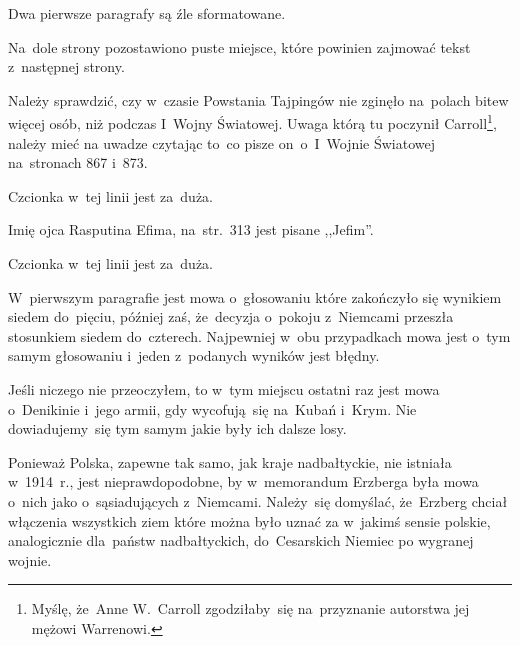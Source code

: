 \documentclass[a4paper,11pt]{article}
\begin{document}
\start {} Dwa pierwsze paragrafy są źle sformatowane.

\vspace{\spaceFour}


\start {} Na~dole strony pozostawiono puste miejsce, które
powinien zajmować tekst z~następnej strony.

\vspace{\spaceFour}


\start {} Należy sprawdzić, czy w~czasie Powstania Tajpingów
nie zginęło na~polach bitew więcej osób, niż podczas I~Wojny
Światowej. Uwaga którą tu poczynił Carroll\footnote{Myślę, że~Anne
  W.~Carroll zgodziłaby~się na~przyznanie autorstwa jej mężowi
  Warrenowi.}, należy mieć na uwadze czytając to~co pisze
on~o~I~Wojnie Światowej na~stronach 867 i~873.

\vspace{\spaceFour}


\start {} Czcionka w~tej linii jest za~duża.

\vspace{\spaceFour}


\start {} Imię ojca Rasputina Efima, na~str.~313 jest
pisane ,,Jefim''.

\vspace{\spaceFour}


\start {} Czcionka w~tej linii jest za~duża.

\vspace{\spaceFour}


\start {} W~pierwszym paragrafie jest mowa o~głosowaniu które
zakończyło się wynikiem siedem do~pięciu, później zaś, że~decyzja
o~pokoju z~Niemcami przeszła stosunkiem siedem do~czterech. Najpewniej
w~obu przypadkach mowa jest o~tym samym głosowaniu i~jeden z~podanych
wyników jest błędny.

\vspace{\spaceFour}


\start {} Jeśli niczego nie przeoczyłem, to w~tym miejscu
ostatni raz jest mowa o~Denikinie i~jego armii, gdy wycofują~się
na~Kubań i~Krym. Nie dowiadujemy~się tym samym jakie były ich dalsze
losy.

\vspace{\spaceFour}


\start {} Ponieważ Polska, zapewne tak samo, jak kraje
nadbałtyckie, nie istniała w~1914~r., jest nieprawdopodobne, by
w~memorandum Erzberga była mowa o~nich jako o~sąsiadujących
z~Niemcami. Należy~się domyślać, że~Erzberg chciał włączenia
wszystkich ziem które można było uznać za w~jakimś sensie polskie,
analogicznie dla~państw nadbałtyckich, do~Cesarskich Niemiec po
wygranej wojnie.
\end{document}
